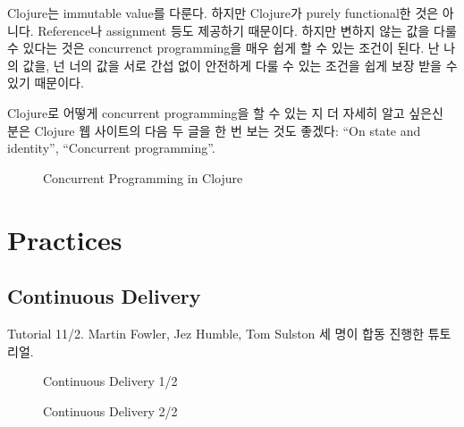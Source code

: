 \documentclass[11pt]{article}
\begin{document}
Clojure는 immutable value를 다룬다. 하지만  Clojure가 purely functional한 
것은 아니다. Reference나 assignment 등도 제공하기 때문이다. 
하지만 변하지 않는 값을 다룰 수 있다는 것은 concurrenct programming을 매우 
쉽게 할 수 있는 조건이 된다. 난 나의 값을, 넌 너의 값을 서로 간섭 없이 
안전하게 다룰 수 있는 조건을 쉽게 보장 받을 수 있기 때문이다.

Clojure로 어떻게 concurrent programming을 할 수 있는 지 더 자세히 알고 싶은신
분은 Clojure 웹 사이트의 다음 두 글을 한 번 보는 것도 좋겠다:  ``On state and
identity'', ``Concurrent programming''.
 
\begin{figure}[t]
    \begin{Frame}
        \begin{center}
        \end{center}
    \end{Frame}
    \caption{Concurrent Programming in Clojure}
    \label{clojure concurrent}
\end{figure}

\section{Practices}

\subsection{Continuous Delivery}

Tutorial 11/2.
Martin Fowler, Jez Humble, Tom Sulston 세 명이 합동 진행한 튜토리얼.

\begin{figure}[t]
    \begin{Frame}
        \begin{center}
        \end{center}
    \end{Frame}
    \caption{Continuous Delivery 1/2}
    \label{Continuous Delivery 1}
\end{figure}

\begin{figure}[t]
    \begin{Frame}
        \begin{center}
        \end{center}
    \end{Frame}
    \caption{Continuous Delivery 2/2}
    \label{Continuous Delivery 2}
\end{figure}
\end{document}
